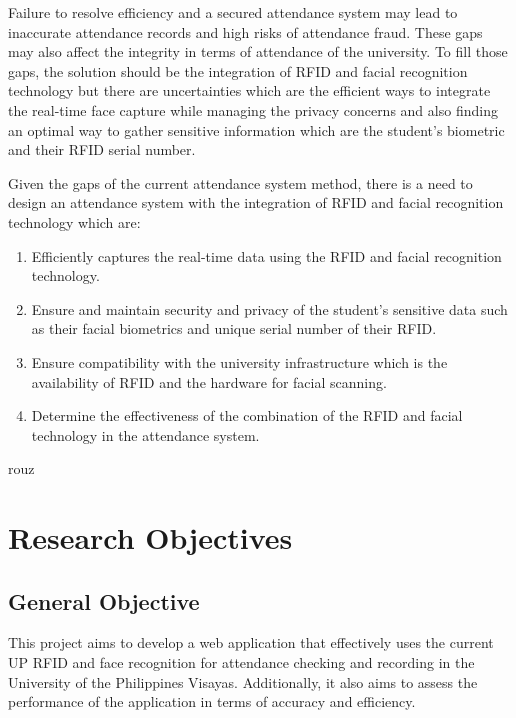 Failure to resolve efficiency and a secured attendance system may lead to inaccurate attendance records and high risks of attendance fraud. These gaps may also affect the integrity in terms of attendance of the university. To fill those gaps, the solution should be the integration of RFID and facial recognition technology but there are uncertainties which are the efficient ways to integrate the real-time face capture while  managing the privacy concerns and also finding an optimal way to gather sensitive information which are the student’s biometric and their RFID serial number. 

Given the gaps of the current attendance system method, there is a need to design an attendance system with the integration of RFID and facial recognition technology which are:

\begin{enumerate}
	\item Efficiently captures the real-time data using the RFID and facial recognition technology.
	\item  Ensure and maintain security and privacy of the student’s sensitive data such as their facial biometrics and unique serial number of their RFID.  
	\item Ensure compatibility with the university infrastructure which is the availability of RFID and the hardware for facial scanning. 
	\item 	Determine the effectiveness of the combination of the RFID and facial technology in the attendance system. 
\end{enumerate}

rouz

\section{Research Objectives}
\label{sec:researchobjectives}

\subsection{General Objective}
\label{sec:generalobjective}

This project aims to develop a web application that effectively uses the current UP RFID and face recognition for attendance checking and recording in the University of the Philippines Visayas. Additionally, it also aims to assess the performance of the application in terms of accuracy and efficiency.



